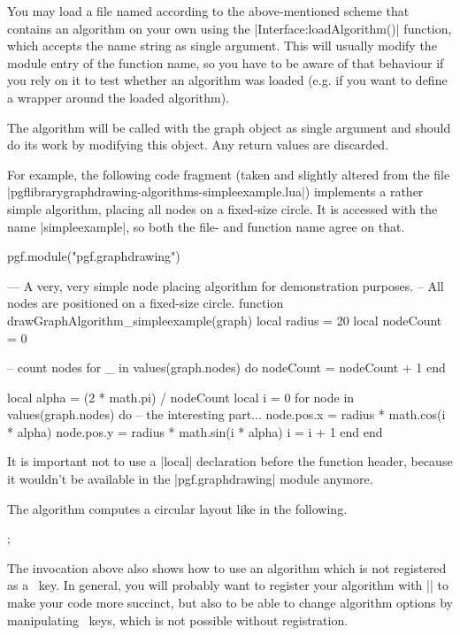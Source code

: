 You may load a file named according to the above-mentioned scheme that
contains an algorithm on your own using the |Interface:loadAlgorithm()|
function, which accepts the name string as single argument. This will
usually modify the module entry of the function name, so you have to
be aware of that behaviour if you rely on it to test whether an
algorithm was loaded (e.g. if you want to define a wrapper around the
loaded algorithm).

The algorithm will be called with the graph object as single argument
and should do its work by modifying this object. Any return
values are discarded.

For example, the following code fragment (taken and slightly altered
from the file |pgflibrarygraphdrawing-algorithms-simpleexample.lua|)
implements a rather simple algorithm, placing all nodes on a fixed-size
circle.  It is accessed with the name |simpleexample|, so both the
file- and function name agree on that.

\begin{codeexample}
pgf.module("pgf.graphdrawing")

--- A very, very simple node placing algorithm for demonstration purposes.
-- All nodes are positioned on a fixed-size circle.
function drawGraphAlgorithm_simpleexample(graph)
   local radius = 20
   local nodeCount = 0

   -- count nodes
   for _ in values(graph.nodes) do
      nodeCount = nodeCount + 1
   end

   local alpha = (2 * math.pi) / nodeCount
   local i = 0
   for node in values(graph.nodes) do
      -- the interesting part...
      node.pos.x = radius * math.cos(i * alpha)
      node.pos.y = radius * math.sin(i * alpha)
      i = i + 1
   end
end
\end{codeexample}

It is important not to use a |local| declaration before the function
header, because it wouldn't be available in the |pgf.graphdrawing|
module anymore.

The algorithm computes a circular layout like in the following.

\begin{codeexample}[]
\tikzpicture [graphs/.cd, graph drawing engine, algorithm=simpleexample]
  ;
\endtikzpicture
\end{codeexample}

The invocation above also shows how to use an algorithm which is not
registered as a \tikzname\ key.  In general, you will probably want to
register your algorithm with |\tikzgraphsset| to make your code more
succinct, but also to be able to change algorithm options by manipulating
\tikzname\ keys, which is not possible without registration.  

